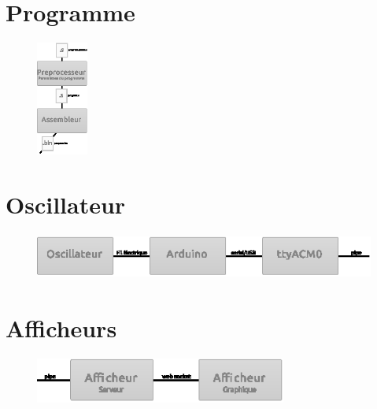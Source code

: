 \documentclass{article}
\begin{document}
\section{Programme}

\begin{figure}
\begin{center}
\includegraphics[width=0.15\textwidth]{zoom_prog.eps}
\end{center}
\end{figure}


\section{Oscillateur}

\begin{figure}[h]
\centering
\includegraphics[height=4em]{zoom_input.eps}
\end{figure}

\section{Afficheurs}

\begin{figure}[h]
\centering
\includegraphics[height=4em]{zoom_output.eps}
\end{figure}
\end{document}
